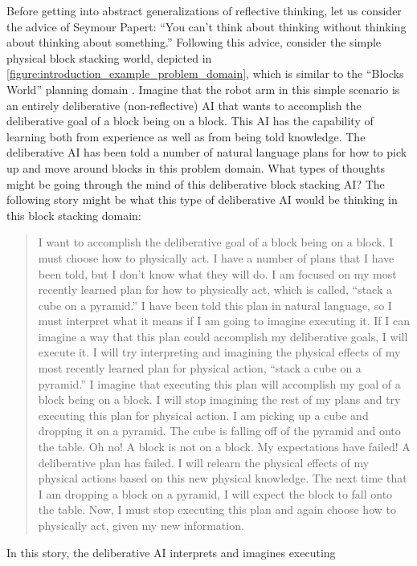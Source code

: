 Before getting into abstract generalizations of reflective thinking,
let us consider the advice of Seymour Papert: ``You can't think about
thinking without thinking about thinking about something.''  Following
this advice, consider the simple physical block stacking world,
depicted in {\autoref{figure:introduction_example_problem_domain}},
which is similar to the ``Blocks World'' planning domain
{\cite[]{winograd:1970}}.  Imagine that the robot arm in this simple
scenario is an entirely deliberative (non-reflective) AI that wants to
accomplish the deliberative goal of a block being on a block.  This AI
has the capability of learning both from experience as well as from
being told knowledge.  The deliberative AI has been told a number of
natural language plans for how to pick up and move around blocks in
this problem domain.  What types of thoughts might be going through
the mind of this deliberative block stacking AI?  The following story
might be what this type of deliberative AI would be thinking in this
block stacking domain:
\begin{quote}
  I want to accomplish the deliberative goal of a block being on a
  block.  I must choose how to physically act.  I have a number of
  plans that I have been told, but I don't know what they will do.  I
  am focused on my most recently learned plan for how to physically
  act, which is called, ``stack a cube on a pyramid.''  I have been
  told this plan in natural language, so I must interpret what it
  means if I am going to imagine executing it.  If I can imagine a way
  that this plan could accomplish my deliberative goals, I will
  execute it.  I will try interpreting and imagining the physical
  effects of my most recently learned plan for physical action,
  ``stack a cube on a pyramid.''  I imagine that executing this plan
  will accomplish my goal of a block being on a block.  I will stop
  imagining the rest of my plans and try executing this plan for
  physical action.  I am picking up a cube and dropping it on a
  pyramid.  The cube is falling off of the pyramid and onto the table.
  Oh no!  A block is not on a block.  My expectations have failed!  A
  deliberative plan has failed.  I will relearn the physical effects
  of my physical actions based on this new physical knowledge.  The
  next time that I am dropping a block on a pyramid, I will expect the
  block to fall onto the table.  Now, I must stop executing this plan
  and again choose how to physically act, given my new information.
\end{quote}
In this story, the deliberative AI interprets and imagines executing
